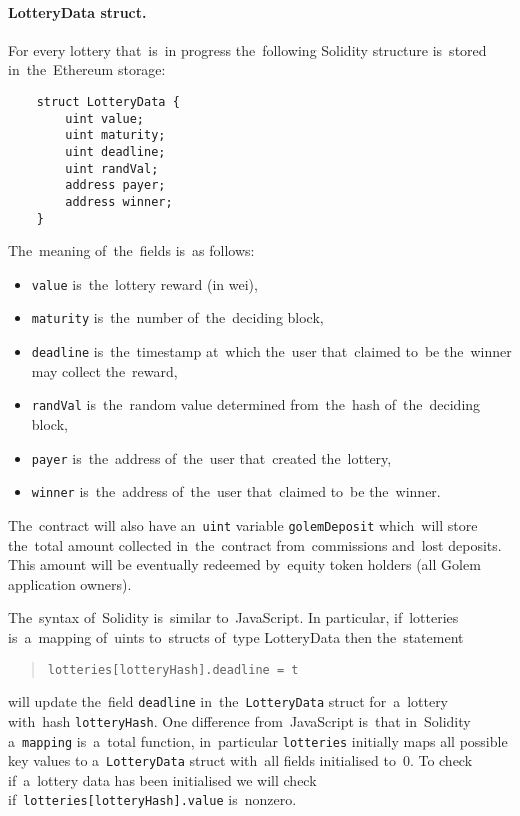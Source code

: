 \documentclass[a4paper]{article}
\begin{document}
    \paragraph{LotteryData struct.}
    For every lottery that~is~in progress the~following Solidity structure is~stored in~the~Ethereum storage:

    \begin{lstlisting}
    struct LotteryData {
        uint value;
        uint maturity;
        uint deadline;
        uint randVal;
        address payer;
        address winner;
    }
    \end{lstlisting}
%
    The~meaning of~the~fields is~as follows:
    \begin{itemize}
        \item \texttt{value} is~the~lottery reward (in wei),
        \item \texttt{maturity} is~the~number of~the~deciding block, %
        \item \texttt{deadline} is~the~timestamp at~which the~user that~claimed to~be the~winner may collect
            the~reward, %
        \item \texttt{randVal} is~the~random value determined from~the~hash of~the~deciding block, %
        \item \texttt{payer} is~the~address of~the~user that~created the~lottery,
        \item \texttt{winner} is~the~address of~the~user that~claimed to~be the~winner.
    \end{itemize}
    The~contract will also have an~\texttt{uint} variable \texttt{golemDeposit} which~will store
    the~total amount collected in~the~contract from~commissions and~lost deposits. This amount will be eventually
    redeemed by~equity token holders (all Golem application owners).

    The~syntax of~Solidity is~similar to~JavaScript. In particular, if~lotteries is~a~mapping of~uints to~structs of~type LotteryData then the~statement
    \begin{quote}
      \verb!lotteries[lotteryHash].deadline = t!
    \end{quote}
    will update the~field \texttt{deadline} in~the~\texttt{LotteryData} struct for~a~lottery with~hash
    \texttt{lotteryHash}. One difference from~JavaScript is~that in~Solidity a~\texttt{mapping} is~a~total
    function, in~particular \texttt{lotteries} initially maps all possible key values to
    a~\texttt{LotteryData} struct with~all fields initialised to~0. To check if~a~lottery data has been initialised
    we will check if~\texttt{lotteries[lotteryHash].value} is~nonzero.
\end{document}
